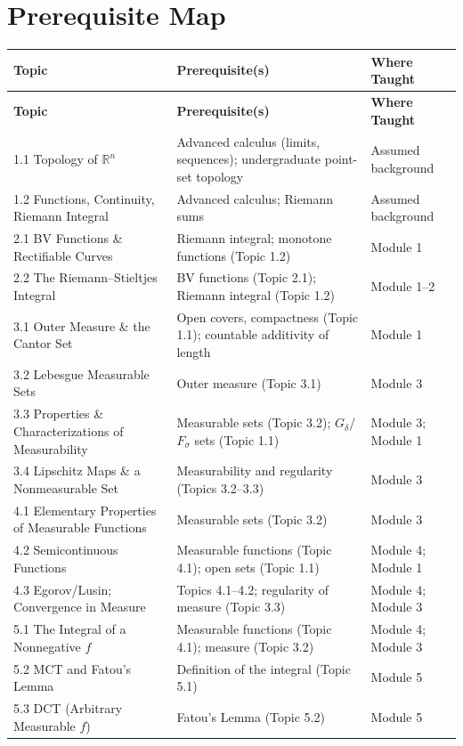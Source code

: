 \documentclass[11pt]{article}
\begin{document}
\section{Prerequisite Map}

\begin{longtable}{@{}p{5.3cm} p{5.7cm} p{3.4cm}@{}}
\toprule
\textbf{Topic} & \textbf{Prerequisite(s)} & \textbf{Where Taught} \\
\midrule
\endfirsthead
\toprule
\textbf{Topic} & \textbf{Prerequisite(s)} & \textbf{Where Taught} \\
\midrule
\endhead
1.1 Topology of $\mathbb{R}^n$ & Advanced calculus (limits, sequences); undergraduate point-set topology & Assumed background \\
1.2 Functions, Continuity, Riemann Integral & Advanced calculus; Riemann sums & Assumed background \\
2.1 BV Functions \& Rectifiable Curves & Riemann integral; monotone functions (Topic 1.2) & Module 1 \\
2.2 The Riemann--Stieltjes Integral & BV functions (Topic 2.1); Riemann integral (Topic 1.2) & Module 1--2 \\
3.1 Outer Measure \& the Cantor Set & Open covers, compactness (Topic 1.1); countable additivity of length & Module 1 \\
3.2 Lebesgue Measurable Sets & Outer measure (Topic 3.1) & Module 3 \\
3.3 Properties \& Characterizations of Measurability & Measurable sets (Topic 3.2); $G_\delta$/$F_\sigma$ sets (Topic 1.1) & Module 3; Module 1 \\
3.4 Lipschitz Maps \& a Nonmeasurable Set & Measurability and regularity (Topics 3.2--3.3) & Module 3 \\
4.1 Elementary Properties of Measurable Functions & Measurable sets (Topic 3.2) & Module 3 \\
4.2 Semicontinuous Functions & Measurable functions (Topic 4.1); open sets (Topic 1.1) & Module 4; Module 1 \\
4.3 Egorov/Lusin; Convergence in Measure & Topics 4.1--4.2; regularity of measure (Topic 3.3) & Module 4; Module 3 \\
5.1 The Integral of a Nonnegative $f$ & Measurable functions (Topic 4.1); measure (Topic 3.2) & Module 4; Module 3 \\
5.2 MCT and Fatou's Lemma & Definition of the integral (Topic 5.1) & Module 5 \\
5.3 DCT (Arbitrary Measurable $f$) & Fatou's Lemma (Topic 5.2) & Module 5 \\

\end{longtable}
\end{document}

